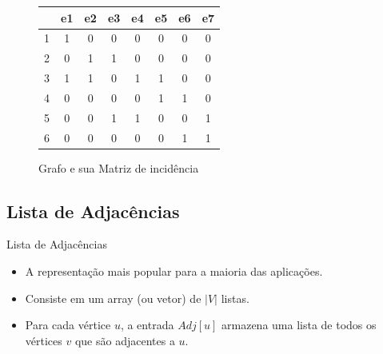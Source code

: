 \documentclass[xcolor=table]{beamer}
\begin{document}
\begin{frame}
  \begin{figure}
    \centering
    \GrafoIncidencia{}\hspace{.5cm}%
    \small
    \begin{tabular}[b]{@{}c|ccccccc@{}}
      \toprule
        & e1 & e2 & e3 & e4 & e5 & e6 & e7 \\
      \midrule
      1 & 1 & 0 & 0 & 0 & 0 & 0 & 0 \\
      2 & 0 & 1 & 1 & 0 & 0 & 0 & 0 \\
      3 & 1 & 1 & 0 & 1 & 1 & 0 & 0 \\
      4 & 0 & 0 & 0 & 0 & 1 & 1 & 0 \\
      5 & 0 & 0 & 1 & 1 & 0 & 0 & 1 \\
      6 & 0 & 0 & 0 & 0 & 0 & 1 & 1 \\
      \bottomrule
    \end{tabular}
    \caption*{Grafo e sua Matriz de incidência}
  \end{figure}
\end{frame}

\subsection{Lista de Adjacências}
\begin{frame}{Lista de Adjacências}
  \vfill
  \begin{itemize}
    \item A representação mais popular para a maioria das aplicações.
    \item Consiste em um array (ou vetor) de $|V|$ listas.
    \item Para cada vértice $u$, a entrada $Adj[u]$ armazena uma lista de todos os vértices $v$ que são adjacentes a $u$.
  \end{itemize}
  \vfill
\end{frame}
\end{document}
